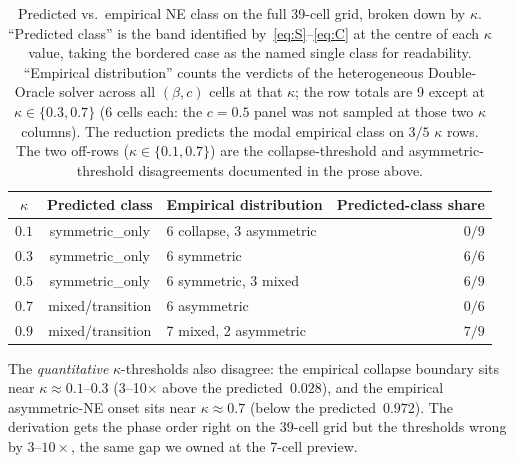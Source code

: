 \documentclass{anvil-paper}
\begin{document}
\begin{table}[h]
  \centering
  \small
  \setlength{\tabcolsep}{6pt}
  \begin{tabular}{cclr}
    \toprule
    $\kappa$ & Predicted class & Empirical distribution
             & Predicted-class share \\
    \midrule
    $0.1$ & \textsf{symmetric\_only}
          & 6 \textsf{collapse}, 3 \textsf{asymmetric}
          & $0/9$ \\
    $0.3$ & \textsf{symmetric\_only}
          & 6 \textsf{symmetric}
          & $6/6$ \\
    $0.5$ & \textsf{symmetric\_only}
          & 6 \textsf{symmetric}, 3 \textsf{mixed}
          & $6/9$ \\
    $0.7$ & \textsf{mixed}/transition
          & 6 \textsf{asymmetric}
          & $0/6$ \\
    $0.9$ & \textsf{mixed}/transition
          & 7 \textsf{mixed}, 2 \textsf{asymmetric}
          & $7/9$ \\
    \bottomrule
  \end{tabular}
  \caption{Predicted vs.\ empirical NE class on the full 39-cell
  grid, broken down by $\kappa$. ``Predicted class'' is the band
  identified by~\eqref{eq:S}--\eqref{eq:C} at the centre of each
  $\kappa$ value, taking the bordered case as the named single class
  for readability. ``Empirical distribution'' counts the verdicts of
  the heterogeneous Double-Oracle solver across all $(\beta, c)$
  cells at that $\kappa$; the row totals are 9 except at
  $\kappa\in\{0.3, 0.7\}$ (6 cells each: the $c{=}0.5$ panel was not
  sampled at those two $\kappa$ columns). The reduction predicts the
  modal empirical class on $3/5$ $\kappa$ rows. The two off-rows
  ($\kappa{\in}\{0.1, 0.7\}$) are the collapse-threshold and
  asymmetric-threshold disagreements documented in the prose
  above.}
  \label{tab:phase-counts}
\end{table}

The \emph{quantitative} $\kappa$-thresholds also disagree: the empirical
collapse boundary sits near $\kappa\approx 0.1$--$0.3$
(3--10$\times$ above the predicted~$0.028$), and the empirical asymmetric-NE
onset sits near $\kappa\approx 0.7$ (below the predicted~$0.972$). The
derivation gets the phase order right on the $39$-cell grid but the
thresholds wrong by $3$--$10\times$, the same gap we owned at the 7-cell
preview.
\end{document}
